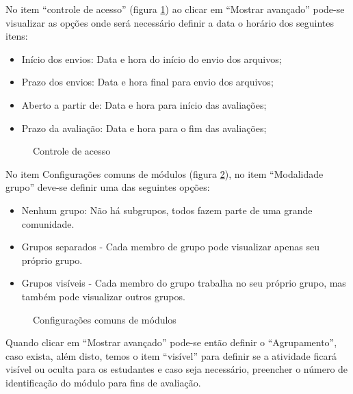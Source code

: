 No item “controle de acesso” (figura \ref{fig:controle_acess}) ao clicar em “Mostrar avançado” pode-se visualizar as opções onde será necessário definir a data o horário dos seguintes itens:

\begin{itemize}
 \item Início dos envios: Data e hora do início do envio dos arquivos;
 \item Prazo dos envios: Data e hora final para envio dos arquivos;
 \item Aberto a partir de: Data e hora para início das avaliações;
 \item Prazo da avaliação: Data e hora para o fim das avaliações;
\end{itemize}

\begin{figure}
 \begin{center}
  \caption{Controle de acesso}
  \label{fig:controle_acess}
 \end{center}
\end{figure}

No item Configurações comuns de módulos (figura \ref{fig:controle_comum}), no item “Modalidade grupo” deve-se definir uma das seguintes opções:

\begin{itemize}
 \item Nenhum grupo: Não há subgrupos, todos fazem parte de uma grande comunidade.
 \item Grupos separados - Cada membro de grupo pode visualizar apenas seu próprio grupo.
 \item Grupos visíveis - Cada membro do grupo trabalha no seu próprio grupo, mas também pode visualizar outros grupos.
\end{itemize}

\begin{figure}
 \begin{center}
  \caption{Configurações comuns de módulos}
  \label{fig:controle_comum}
 \end{center}
\end{figure}

Quando clicar em “Mostrar avançado” pode-se então definir o “Agrupamento”, caso exista, além disto, temos o item “visível” para definir se a atividade ficará visível ou oculta para os estudantes e caso seja necessário, preencher o número de identificação do módulo para fins de avaliação.

